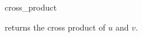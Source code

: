 \begin{ccRefFunction}{cross_product}

       {returns the cross product of $u$ and $v$.}
\end{ccRefFunction}

